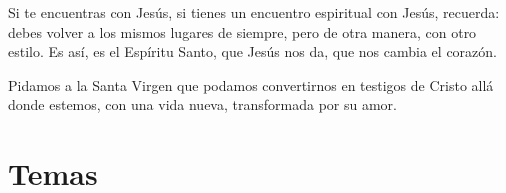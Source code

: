 \begin{body}
					Si te encuentras con Jesús, si tienes un encuentro espiritual con Jesús, recuerda: debes volver a los mismos lugares de siempre, pero de otra manera, con otro estilo. Es así, es el Espíritu Santo, que Jesús nos da, que nos cambia el corazón.
					
					Pidamos a la Santa Virgen que podamos convertirnos en testigos de Cristo allá donde estemos, con una vida nueva, transformada por su amor.
				\end{body}
			
\newsection

	\section{Temas}
